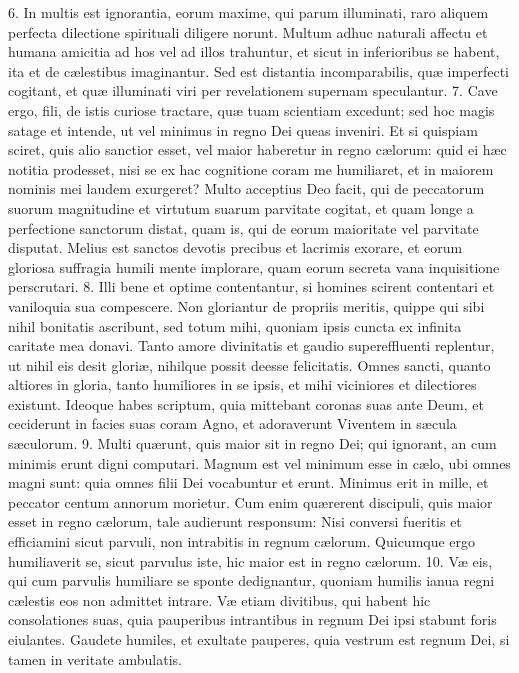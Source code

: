 6. In multis est ignorantia, eorum maxime, qui parum illuminati, raro aliquem perfecta dilectione spirituali diligere norunt. Multum adhuc naturali affectu et humana amicitia ad hos vel ad illos trahuntur, et sicut in inferioribus se habent, ita et de cælestibus imaginantur. Sed est distantia incomparabilis, quæ imperfecti cogitant, et quæ illuminati viri per revelationem supernam speculantur.
7. Cave ergo, fili, de istis curiose tractare, quæ tuam scientiam excedunt; sed hoc magis satage et intende, ut vel minimus in regno Dei queas inveniri. Et si quispiam sciret, quis alio sanctior esset, vel maior haberetur in regno cælorum: quid ei hæc notitia prodesset, nisi se ex hac cognitione coram me humiliaret, et in maiorem nominis mei laudem exurgeret? Multo acceptius Deo facit, qui de peccatorum suorum magnitudine et virtutum suarum parvitate cogitat, et quam longe a perfectione sanctorum distat, quam is, qui de eorum maioritate vel parvitate disputat. Melius est sanctos devotis precibus et lacrimis exorare, et eorum gloriosa suffragia humili mente implorare, quam eorum secreta vana inquisitione perscrutari.
8. Illi bene et optime contentantur, si homines scirent contentari et vaniloquia sua compescere. Non gloriantur de propriis meritis, quippe qui sibi nihil bonitatis ascribunt, sed totum mihi, quoniam ipsis cuncta ex infinita caritate mea donavi. Tanto amore divinitatis et gaudio supereffluenti replentur, ut nihil eis desit gloriæ, nihilque possit deesse felicitatis. Omnes sancti, quanto altiores in gloria, tanto humiliores in se ipsis, et mihi viciniores et dilectiores existunt. Ideoque habes scriptum, quia mittebant coronas suas ante Deum, et ceciderunt in facies suas coram Agno, et adoraverunt Viventem in sæcula sæculorum.
9. Multi quærunt, quis maior sit in regno Dei; qui ignorant, an cum minimis erunt digni computari. Magnum est vel minimum esse in cælo, ubi omnes magni sunt: quia omnes filii Dei vocabuntur et erunt. Minimus erit in mille, et peccator centum annorum morietur. Cum enim quærerent discipuli, quis maior esset in regno cælorum, tale audierunt responsum: Nisi conversi fueritis et efficiamini sicut parvuli, non intrabitis in regnum cælorum. Quicumque ergo humiliaverit se, sicut parvulus iste, hic maior est in regno cælorum.
10. Væ eis, qui cum parvulis humiliare se sponte dedignantur, quoniam humilis ianua regni cælestis eos non admittet intrare. Væ etiam divitibus, qui habent hic consolationes suas, quia pauperibus intrantibus in regnum Dei ipsi stabunt foris eiulantes. Gaudete humiles, et exultate pauperes, quia vestrum est regnum Dei, si tamen in veritate ambulatis.


